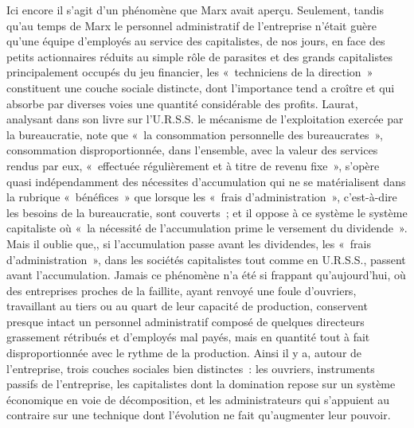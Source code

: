 \documentclass[french,twoside]{book} %
\begin{document}
Ici encore il s'agit d'un phénomène que Marx avait aperçu. Seulement, tandis qu'au temps de Marx le personnel administratif de l'entreprise n'était guère qu'une équipe d'employés au service des capitalistes, de nos jours, en face des petits actionnaires réduits au simple rôle de parasites et des grands capitalistes principalement occupés du jeu financier, les « techniciens de la direction » constituent une couche sociale distincte, dont l'importance tend a croître et qui absorbe par diverses voies une quantité considérable des profits. Laurat, analysant dans son livre sur l'U.R.S.S. le mécanisme de l'exploitation exercée par la bureaucratie, note que « la consommation personnelle des bureaucrates », consommation disproportionnée, dans l'ensemble, avec la valeur des services rendus par eux, « effectuée régulièrement et à titre de revenu fixe », s'opère quasi indépendamment des nécessites d'accumulation qui ne se matérialisent dans la rubrique « bénéfices » que lorsque les « frais d'administration », c'est-à-dire les besoins de la bureaucratie, sont couverts ; et il oppose à ce système le système capitaliste où « la nécessité de l'accumulation prime le versement du dividende ». Mais il oublie que,, si l'accumulation passe avant les dividendes, les « frais d'administration », dans les sociétés capitalistes tout comme en U.R.S.S., passent avant l'accumulation. Jamais ce phénomène n'a été si frappant qu'aujourd'hui, où des entreprises proches de la faillite, ayant renvoyé une foule d'ouvriers, travaillant au tiers ou au quart de leur capacité de production, conservent presque intact un personnel administratif composé de quelques directeurs grassement rétribués et d'employés mal payés, mais en quantité tout à fait disproportionnée avec le rythme de la production. Ainsi il y a, autour de l'entreprise, trois couches sociales bien distinctes : les ouvriers, instruments passifs de l'entreprise, les capitalistes dont la domination repose sur un système économique en voie de décomposition, et les administrateurs qui s'appuient au contraire sur une technique dont l'évolution ne fait qu'augmenter leur pouvoir.\par
\end{document}
